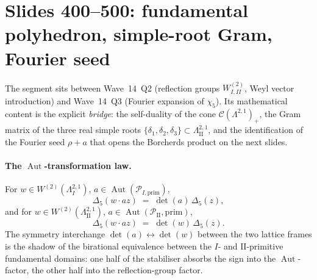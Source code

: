 
\providecommand{\Lat}{\Lambda}
\providecommand{\II}{\mathrm{II}}
\providecommand{\Aut}{\operatorname{Aut}}
\providecommand{\kch}{\kappa_{\mathrm{ch}}}
\providecommand{\kBKM}{\kappa_{\mathrm{BKM}}}
\providecommand{\kcat}{\kappa_{\mathrm{cat}}}
\providecommand{\PII}{\mathcal{P}_{\II}}
\providecommand{\Cone}{\mathcal{C}}
\providecommand{\Rpos}{\mathbb{R}_{\ge 0}}
\providecommand{\Rspos}{\mathbb{R}_{>0}}

\section*{Slides 400–500: fundamental polyhedron, simple-root Gram, Fourier seed}

The segment sits between Wave~14~Q2 (reflection groups
$W^{(2)}_{I,II}$, Weyl vector introduction) and Wave~14~Q3 (Fourier
expansion of $\chi_5$). Its mathematical content is the explicit
\emph{bridge}: the self-duality of the cone $\Cone(\Lat^{2,1})_+$,
the Gram matrix of the three real simple roots
$\{\delta_1,\delta_2,\delta_3\}\subset \Lat^{2,1}_{\II}$, and the
identification of the Fourier seed $\rho + a$ that opens the
Borcherds product on the next slides.

\paragraph{The $\Aut$-transformation law.} For $w \in W^{(2)}(\Lat^{2,1}_{I})$,
$a \in \Aut(\mathcal{P}_{I,\mathrm{prim}})$,
\[
  \Delta_5(w\cdot az) \;=\; \det(a)\,\Delta_5(z),
\]
and for $w \in W^{(2)}(\Lat^{2,1}_{\II})$,
$a \in \Aut(\PII,\mathrm{prim})$,
\[
  \Delta_5(w\cdot az) \;=\; \det(w)\,\Delta_5(z).
\]
The symmetry interchange $\det(a) \leftrightarrow \det(w)$ between
the two lattice frames is the shadow of the birational equivalence
between the $I$- and $\II$-primitive fundamental domains: one half
of the stabiliser absorbs the sign into the $\Aut$-factor, the other
half into the reflection-group factor.

